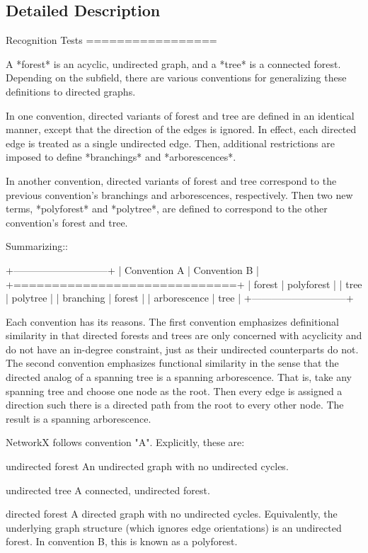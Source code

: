 \subsection{Detailed Description}
\begin{DoxyVerb}Recognition Tests
=================

A *forest* is an acyclic, undirected graph, and a *tree* is a connected forest.
Depending on the subfield, there are various conventions for generalizing these
definitions to directed graphs.

In one convention, directed variants of forest and tree are defined in an
identical manner, except that the direction of the edges is ignored. In effect,
each directed edge is treated as a single undirected edge. Then, additional
restrictions are imposed to define *branchings* and *arborescences*.

In another convention, directed variants of forest and tree correspond to
the previous convention's branchings and arborescences, respectively. Then two
new terms, *polyforest* and *polytree*, are defined to correspond to the other
convention's forest and tree.

Summarizing::

   +-----------------------------+
   | Convention A | Convention B |
   +=============================+
   | forest       | polyforest   |
   | tree         | polytree     |
   | branching    | forest       |
   | arborescence | tree         |
   +-----------------------------+

Each convention has its reasons. The first convention emphasizes definitional
similarity in that directed forests and trees are only concerned with
acyclicity and do not have an in-degree constraint, just as their undirected
counterparts do not. The second convention emphasizes functional similarity
in the sense that the directed analog of a spanning tree is a spanning
arborescence. That is, take any spanning tree and choose one node as the root.
Then every edge is assigned a direction such there is a directed path from the
root to every other node. The result is a spanning arborescence.

NetworkX follows convention "A". Explicitly, these are:

undirected forest
   An undirected graph with no undirected cycles.

undirected tree
   A connected, undirected forest.

directed forest
   A directed graph with no undirected cycles. Equivalently, the underlying
   graph structure (which ignores edge orientations) is an undirected forest.
   In convention B, this is known as a polyforest.


\end{DoxyVerb}
